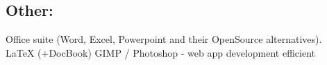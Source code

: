 \documentclass[letterpaper]{deedy-resume.en} %
\begin{document}
\begin{minipage}[t]{0.60\textwidth}
\subsection{Other:}
Office suite (Word, Excel, Powerpoint and their OpenSource alternatives). \\
LaTeX (+DocBook) \textbullet{} GIMP / Photoshop - web app development efficient \\

\end{minipage} %

\end{document}
